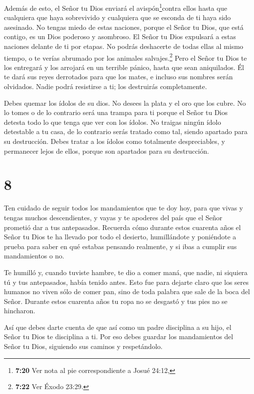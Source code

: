  Además de esto, el Señor tu Dios enviará el
avispón\footnote{\textbf{7:20} Ver nota al pie correspondiente a Josué
  24:12,}contra ellos hasta que cualquiera que haya sobrevivido y
cualquiera que se esconda de ti haya sido asesinado.  No
tengas miedo de estas naciones, porque el Señor tu Dios, que está
contigo, es un Dios poderoso y asombroso.  El Señor tu Dios
expulsará a estas naciones delante de ti por etapas. No podrás
deshacerte de todas ellas al mismo tiempo, o te verías abrumado por los
animales salvajes.\footnote{\textbf{7:22} Ver Éxodo 23:29.}
 Pero el Señor tu Dios te los entregará y los arrojará en
un terrible pánico, hasta que sean aniquilados.  Él te dará
sus reyes derrotados para que los mates, e incluso sus nombres serán
olvidados. Nadie podrá resistirse a ti; los destruirás completamente.

 Debes quemar los ídolos de su dios. No desees la plata y
el oro que los cubre. No lo tomes o de lo contrario será una trampa para
ti porque el Señor tu Dios detesta todo lo que tenga que ver con los
ídolos.  No traigas ningún ídolo detestable a tu casa, de
lo contrario serás tratado como tal, siendo apartado para su
destrucción. Debes tratar a los ídolos como totalmente despreciables, y
permanecer lejos de ellos, porque son apartados para su destrucción.

\hypertarget{section-7}{%
\section{8}\label{section-7}}

 Ten cuidado de seguir todos los mandamientos que te doy
hoy, para que vivas y tengas muchos descendientes, y vayas y te apoderes
del país que el Señor prometió dar a tus antepasados. 
Recuerda cómo durante estos cuarenta años el Señor tu Dios te ha llevado
por todo el desierto, humillándote y poniéndote a prueba para saber en
qué estabas pensando realmente, y si ibas a cumplir sus mandamientos o
no.

 Te humilló y, cuando tuviste hambre, te dio a comer maná,
que nadie, ni siquiera tú y tus antepasados, había tenido antes. Esto
fue para dejarte claro que los seres humanos no viven sólo de comer pan,
sino de toda palabra que sale de la boca del Señor.  Durante
estos cuarenta años tu ropa no se desgastó y tus pies no se hincharon.

 Así que debes darte cuenta de que así como un padre
disciplina a su hijo, el Señor tu Dios te disciplina a ti. 
Por eso debes guardar los mandamientos del Señor tu Dios, siguiendo sus
caminos y respetándolo.

